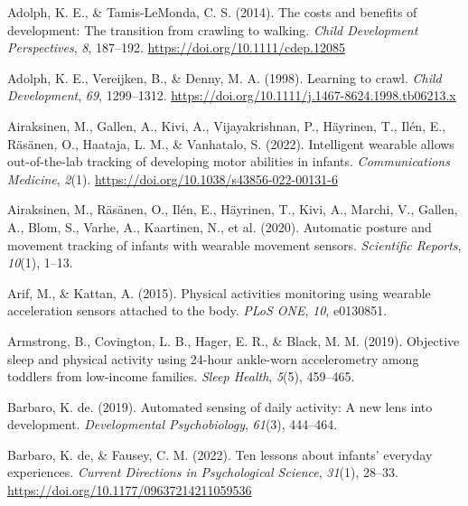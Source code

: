 \documentclass[
  man]{apa6}
\newlength{\cslhangindent}
\newlength{\cslentryspacingunit} %
\newenvironment{CSLReferences}[2] %
 {%
  \setlength{\parindent}{0pt}
  \ifodd #1
  \let\oldpar\par
  \def\par{\hangindent=\cslhangindent\oldpar}
  \fi
  \setlength{\parskip}{#2\cslentryspacingunit}
 }%
 {}
\begin{document}
\hypertarget{refs}{}
\begin{CSLReferences}{1}{0}
\leavevmode{}%
Adolph, K. E., \& Tamis-LeMonda, C. S. (2014). The costs and benefits of development: The transition from crawling to walking. \emph{Child Development Perspectives}, \emph{8}, 187--192. \url{https://doi.org/10.1111/cdep.12085}

\leavevmode{}%
Adolph, K. E., Vereijken, B., \& Denny, M. A. (1998). Learning to crawl. \emph{Child Development}, \emph{69}, 1299--1312. \url{https://doi.org/10.1111/j.1467-8624.1998.tb06213.x}

\leavevmode{}%
Airaksinen, M., Gallen, A., Kivi, A., Vijayakrishnan, P., Häyrinen, T., Ilén, E., Räsänen, O., Haataja, L. M., \& Vanhatalo, S. (2022). Intelligent wearable allows out-of-the-lab tracking of developing motor abilities in infants. \emph{Communications Medicine}, \emph{2}(1). \url{https://doi.org/10.1038/s43856-022-00131-6}

\leavevmode{}%
Airaksinen, M., Räsänen, O., Ilén, E., Häyrinen, T., Kivi, A., Marchi, V., Gallen, A., Blom, S., Varhe, A., Kaartinen, N., et al. (2020). Automatic posture and movement tracking of infants with wearable movement sensors. \emph{Scientific Reports}, \emph{10}(1), 1--13.

\leavevmode{}%
Arif, M., \& Kattan, A. (2015). Physical activities monitoring using wearable acceleration sensors attached to the body. \emph{{PLoS ONE}}, \emph{10}, e0130851.

\leavevmode{}%
Armstrong, B., Covington, L. B., Hager, E. R., \& Black, M. M. (2019). Objective sleep and physical activity using 24-hour ankle-worn accelerometry among toddlers from low-income families. \emph{Sleep Health}, \emph{5}(5), 459--465.

\leavevmode{}%
Barbaro, K. de. (2019). Automated sensing of daily activity: A new lens into development. \emph{Developmental Psychobiology}, \emph{61}(3), 444--464.

\leavevmode{}%
Barbaro, K. de, \& Fausey, C. M. (2022). Ten lessons about infants' everyday experiences. \emph{Current Directions in Psychological Science}, \emph{31}(1), 28--33. \url{https://doi.org/10.1177/09637214211059536}


\end{CSLReferences}
\end{document}

